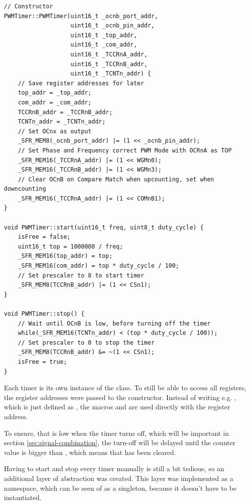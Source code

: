 \begin{lstlisting}[caption=PWMTimer class, label=lst:pwmtimer]
// Constructor
PWMTimer::PWMTimer(uint16_t _ocnb_port_addr,
				   uint16_t _ocnb_pin_addr,
				   uint16_t _top_addr,
				   uint16_t _com_addr,
				   uint16_t _TCCRnA_addr,
				   uint16_t _TCCRnB_addr, 
				   uint16_t _TCNTn_addr) {
    // Save register addresses for later
    top_addr = _top_addr;
    com_addr = _com_addr;
    TCCRnB_addr = _TCCRnB_addr;
    TCNTn_addr = _TCNTn_addr;
    // Set OCnx as output
    _SFR_MEM8(_ocnb_port_addr) |= (1 << _ocnb_pin_addr);
    // Set Phase and Frequency correct PWM Mode with OCRnA as TOP
    _SFR_MEM16(_TCCRnA_addr) |= (1 << WGMn0);
    _SFR_MEM16(_TCCRnB_addr) |= (1 << WGMn3);
    // Clear OCnB on Compare Match when upcounting, set when downcounting
    _SFR_MEM16(_TCCRnA_addr) |= (1 << COMnB1);
}

void PWMTimer::start(uint16_t freq, uint8_t duty_cycle) {
    isFree = false;
    uint16_t top = 1000000 / freq;
    _SFR_MEM16(top_addr) = top;
    _SFR_MEM16(com_addr) = top * duty_cycle / 100;
    // Set prescaler to 8 to start timer
    _SFR_MEM8(TCCRnB_addr) |= (1 << CSn1);
}

void PWMTimer::stop() {
    // Wait until OCnB is low, before turning off the timer
    while(_SFR_MEM16(TCNTn_addr) < (top * duty_cycle / 100));
    // Set prescaler to 0 to stop the timer
    _SFR_MEM8(TCCRnB_addr) &= ~(1 << CSn1);
    isFree = true;
}
\end{lstlisting}

Each timer is its own instance of the  class. To still be able to access all registers, the register addresses were passed to the constructor. Instead of writing e.g. , which is just defined as , the macros  and  are used directly with the register address.

To ensure, that  is low when the timer turns off, which will be important in section \ref{sec:signal-combination}, the turn-off will be delayed until the counter value is bigger than , which means that  has been cleared.

Having to start and stop every timer manually is still a bit tedious, so an additional layer of abstraction was created. This layer was implemented as a namespace, which can be seen of as a singleton, because it doesn't have to be instantiated.

